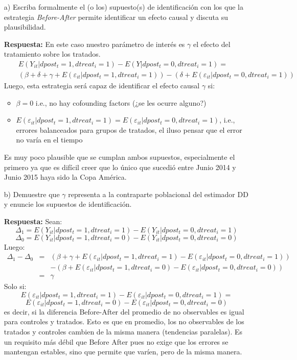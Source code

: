 \documentclass[11pt]{article}
\begin{document}
\begin{enumerate}
\item[a)] Escriba formalmente el (o los) supuesto(s) de identificación con los que la estrategia \textit{Before-After}  permite identificar un efecto causal y discuta su plausibilidad.  

\textbf{Respuesta:}
En este caso nuestro parámetro de interés es $\gamma$ el efecto del tratamiento sobre los tratados.
\begin{eqnarray*}
&& E(Y_{it} |dpost_t=1,dtreat_i=1)-E(Y|dpost_t=0,dtreat_i=1) = \\ && (\beta + \delta +\gamma + E(\varepsilon_{it} |dpost_t=1,dtreat_i=1))
-(\delta + E(\varepsilon_{it} |dpost_t=0,dtreat_i=1))
\end{eqnarray*}
Luego, esta estrategia será capaz de identificar el efecto causal $\gamma$ si:
	\begin{itemize}
	\item $\beta=0$ i.e., no hay cofounding factors (¿se les ocurre alguno?)
	\item $E(\varepsilon_{it} |dpost_t=1,dtreat_i=1)=E(\varepsilon_{it} |dpost_t=0,dtreat_i=1)$, i.e., errores balanceados para grupos de tratados, el iluso pensar que el error no varía en el tiempo
	\end{itemize}
Es muy poco plausible que se cumplan ambos supuestos, especialmente el primero ya que es difícil creer que lo único que sucedió entre Junio 2014 y Junio 2015 haya sido la Copa América.

\item[b)] Demuestre que $\gamma$ representa a la contraparte poblacional del estimador DD y enuncie los supuestos de identificación. 

\textbf{Respuesta:}
Sean:
$$\Delta_1=E(Y_{it}|dpost_t=1,dtreat_i=1)-E(Y_{it}|dpost_t=0,dtreat_i=1)$$
$$\Delta_0=E(Y_{it}|dpost_t=1,dtreat_i=0)-E(Y_{it}|dpost_t=0,dtreat_i=0)$$
Luego:
\begin{eqnarray*}
\Delta_1-\Delta_0 &=& (\beta +\gamma + E(\varepsilon_{it} |dpost_t=1,dtreat_i=1)-E(\varepsilon_{it} |dpost_t=0,dtreat_i=1))\\
&& - (\beta +E(\varepsilon_{it} |dpost_t=1,dtreat_i=0)-E(\varepsilon_{it} |dpost_t=0,dtreat_i=0))\\
&=& \gamma
\end{eqnarray*}
Solo si:
$$E(\varepsilon_{it} |dpost_t=1,dtreat_i=1)-E(\varepsilon_{it} |dpost_t=0,dtreat_i=1)=$$ $$E(\varepsilon_{it} |dpost_t=1,dtreat_i=0)-E(\varepsilon_{it} |dpost_t=0,dtreat_i=0)$$
es decir, si la diferencia Before-After del promedio de no observables es igual para controles y tratados. Esto es que en promedio, los no observables de los tratados y controles cambien de la misma manera (tendencias paralelas). Es un requisito más débil que Before After pues no exige que los errores se mantengan estables, sino que permite que varíen, pero de la misma manera.
 

\end{enumerate}
\end{document}
